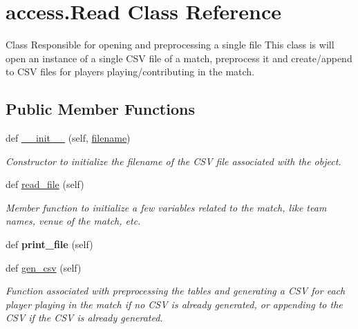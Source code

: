 \hypertarget{classaccess_1_1Read}{}\section{access.\+Read Class Reference}
\label{classaccess_1_1Read}


Class Responsible for opening and preprocessing a single file This class is will open an instance of a single C\+SV file of a match, preprocess it and create/append to C\+SV files for players playing/contributing in the match.  


\subsection*{Public Member Functions}
\begin{DoxyCompactItemize}
\item 
\mbox{\label{classaccess_1_1Read_a2b5862fb02d0f371039b129c549356fc}} 
def \hyperlink{classaccess_1_1Read_a2b5862fb02d0f371039b129c549356fc}{\+\_\+\+\_\+init\+\_\+\+\_\+} (self, \hyperlink{classaccess_1_1Read_afc80365a54bec281993b7a257080b029}{filename})
\begin{DoxyCompactList}\small\item\em Constructor to initialize the filename of the C\+SV file associated with the object. \end{DoxyCompactList}\item 
def \hyperlink{classaccess_1_1Read_aeaf32257315cd5e6b99ce4bfef2d0bdb}{read\+\_\+file} (self)
\begin{DoxyCompactList}\small\item\em Member function to initialize a few variables related to the match, like team names, venue of the match, etc. \end{DoxyCompactList}\item 
\mbox{\label{classaccess_1_1Read_af9ec59006c0081393da1c4e3d8842208}} 
def {\bfseries print\+\_\+file} (self)
\item 
def \hyperlink{classaccess_1_1Read_a9fbc3733d085156a8ee1ac59327483d1}{gen\+\_\+csv} (self)
\begin{DoxyCompactList}\small\item\em Function associated with preprocessing the tables and generating a C\+SV for each player playing in the match if no C\+SV is already generated, or appending to the C\+SV if the C\+SV is already generated. \end{DoxyCompactList}\end{DoxyCompactItemize}
